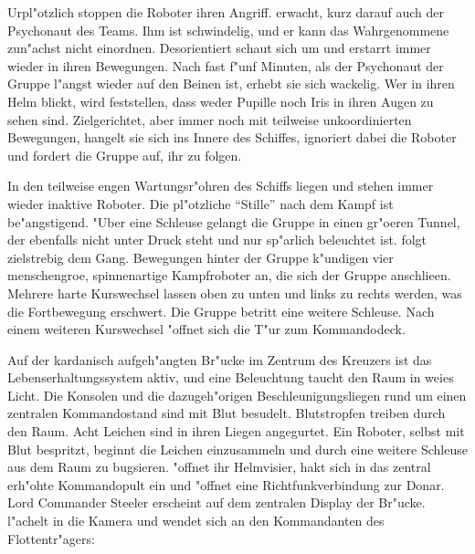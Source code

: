 Urpl"otzlich stoppen die Roboter ihren Angriff. \xl{} erwacht, kurz darauf auch der Psychonaut des Teams. Ihm ist schwindelig, und er kann das Wahrgenommene zun"achst nicht einordnen. Desorientiert schaut sich \xl{} um und erstarrt immer wieder in ihren Bewegungen. Nach fast f"unf Minuten, als der Psychonaut der Gruppe l"angst wieder auf den Beinen ist, erhebt sie sich wackelig. Wer in ihren Helm blickt, wird feststellen, dass weder Pupille noch Iris in ihren Augen zu sehen sind. Zielgerichtet, aber immer noch mit teilweise unkoordinierten Bewegungen, hangelt sie sich ins Innere des Schiffes, ignoriert dabei die Roboter und fordert die Gruppe auf, ihr zu folgen.


In den teilweise engen Wartungsr"ohren des Schiffs liegen und stehen immer wieder inaktive Roboter. Die pl"otzliche ``Stille'' nach dem Kampf ist be"angstigend. "Uber eine Schleuse gelangt die Gruppe in einen gr"o\3eren Tunnel, der ebenfalls nicht unter Druck steht und nur sp"arlich beleuchtet ist. \xl{} folgt zielstrebig dem Gang. Bewegungen hinter der Gruppe k"undigen vier menschengro\3e, spinnenartige Kampfroboter an, die sich der Gruppe anschlie\3en. Mehrere harte Kurswechsel lassen oben zu unten und links zu rechts werden, was die Fortbewegung erschwert. Die Gruppe betritt eine weitere Schleuse. Nach einem weiteren Kurswechsel "offnet sich die T"ur zum Kommandodeck.

Auf der kardanisch aufgeh"angten Br"ucke im Zentrum des Kreuzers ist das Lebenserhaltungssystem aktiv, und eine Beleuchtung taucht den Raum in wei\3es Licht. Die Konsolen und die dazugeh"origen Beschleunigungsliegen rund um einen zentralen Kommandostand sind mit Blut besudelt. Blutstropfen treiben durch den Raum. Acht Leichen sind in ihren Liegen angegurtet. Ein Roboter, selbst mit Blut bespritzt, beginnt die Leichen einzusammeln und durch eine weitere Schleuse aus dem Raum zu bugsieren. \xl{} "offnet ihr Helmvisier, hakt sich in das zentral erh"ohte Kommandopult ein und "offnet eine Richtfunkverbindung zur Donar. Lord Commander Steeler erscheint auf dem zentralen Display der Br"ucke. \xl{} l"achelt in die Kamera und wendet sich an den Kommandanten des Flottentr"agers:


